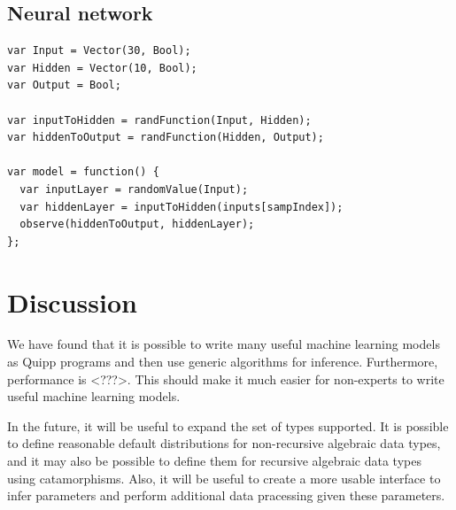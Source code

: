 \documentclass{article}
\begin{document}
\subsection{Neural network}

{\small
\begin{lstlisting}
var Input = Vector(30, Bool);
var Hidden = Vector(10, Bool);
var Output = Bool;

var inputToHidden = randFunction(Input, Hidden);
var hiddenToOutput = randFunction(Hidden, Output);

var model = function() {
  var inputLayer = randomValue(Input);
  var hiddenLayer = inputToHidden(inputs[sampIndex]);
  observe(hiddenToOutput, hiddenLayer);
};
\end{lstlisting}
}

  \section{Discussion}

  We have found that it is possible to write many useful machine learning models as Quipp programs and then use generic algorithms for inference.  Furthermore, performance is <???>.  This should make it much easier for non-experts to write useful machine learning models.
  
  In the future, it will be useful to expand the set of types supported.  It is possible to define reasonable default distributions for non-recursive algebraic data types, and it may also be possible to define them for recursive algebraic data types using catamorphisms.  Also, it will be useful to create a more usable interface to infer parameters and perform additional data pracessing given these parameters.

{}

\end{document}
